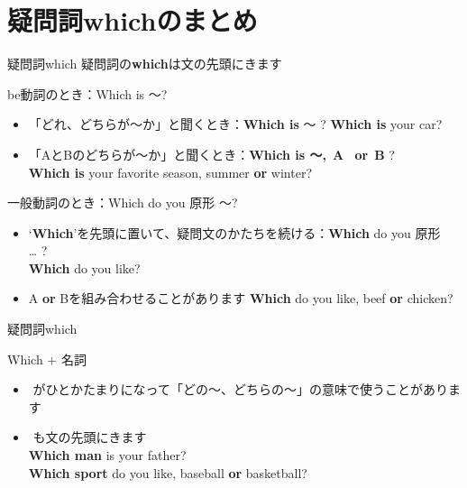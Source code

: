 \documentclass[aspectratio=169,xcolor={dvipsnames,table}]{beamer}
\begin{document}
\section{疑問詞whichのまとめ}
\begin{frame}[plain]{疑問詞which }\small
 疑問詞の{\bfseries which}は文の先頭にきます
\begin{block}{be動詞のとき：Which is ～?}
\small
\begin{itemize}[square]\small
 \item 「どれ、どちらが～か」と聞くとき：{\bfseries Which is}   〜 ?%
\hfill{}{\bfseries Which is} your car?
 \item 「AとBのどちらが～か」と聞くとき：{\bfseries Which is 〜,\,\,\,A \myRisingPitch\,\,\,or\,\,\,B \myDownwardPitch} ?\\
\hfill{}{\bfseries Which is} your favorite season, summer {\bfseries or} winter?
\end{itemize}
     \end{block}

\begin{block}{一般動詞のとき：Which do you 原形 ～?}
\begin{itemize}[square]\small
 \item `{\bfseries Which}'を先頭に置いて、疑問文のかたちを続ける：{\bfseries Which} do you  原形 \ldots\,\,?\\
\hfill{}{\bfseries Which} do you like?
 \item A {\bfseries or} Bを組み合わせることがあります%
\hfill{}{\bfseries Which} do you like, beef {\bfseries or} chicken?
\end{itemize}
     \end{block}
\end{frame}
\begin{frame}[plain]{疑問詞which }\small

\begin{block}{Which $+$ 名詞}\small
\begin{itemize}[square]\small
 \item {}\,\,がひとかたまりになって「どの〜、どちらの～」の意味で使うことがあります
 \item {}\,\,も文の先頭にきます\\%
\hfill{}{\bfseries Which man} is your father?\\
\hfill{}{\bfseries Which sport} do you like, baseball {\bfseries or} basketball?\\
\hfill{}
\end{itemize}
     \end{block}

\mbox{}\hfill{\scriptsize {}}

\end{frame}
\end{document}
